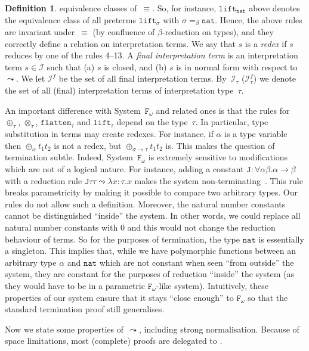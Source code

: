 \documentclass[a4paper,UKenglish,cleveref,autoref,numberwithinsect]{lipics-v2019}
\theoremstyle{definition}
\newtheorem{defn}[theorem]{Definition}
\newcommand{\Fomega}{\mathtt{F}_\omega}
\newcommand{\Iterms}{\mathcal{I}}
\newcommand{\arrtype}{\rightarrow}
\newcommand{\arrW}{\leadsto}
\newcommand{\nat}{\mathtt{nat}}
\newcommand{\flatten}{\mathtt{flatten}}
\newcommand{\lift}{\mathtt{lift}}
\begin{document}
\begin{defn}
  equivalence classes of~$\equiv$. So, for instance,
  $\lift_\nat$ above denotes
  the equivalence class of all preterms $\lift_\sigma$ with
  $\sigma =_\beta \nat$. Hence, the above rules are invariant
  under~$\equiv$ (by confluence of $\beta$-reduction on types), and
  they correctly define a relation on interpretation terms. We say
  that $s$ is a \emph{redex} if $s$ reduces by one of the rules 4--13.
%
  A \emph{final interpretation term} is an interpretation term $s \in
  \Iterms$ such that (a) $s$ is closed, and (b) $s$ is in normal form
  with respect to $\arrW$.  We let $\Iterms^f$ be the set of all final
  interpretation terms. By~$\Iterms_\tau$ ($\Iterms^f_\tau$) we denote
  the set of all (final) interpretation terms of interpretation
  type~$\tau$.
\end{defn}

An important difference with System~$\Fomega$ and related ones is that
the rules for $\oplus_\tau$, $\otimes_\tau$, $\flatten_\tau$ and
$\lift_\tau$ depend on the type~$\tau$. In particular, type
substitution in terms may create redexes. For instance, if $\alpha$ is
a type variable then $\oplus_\alpha t_1 t_2$ is not a redex, but
$\oplus_{\sigma\arrtype\tau} t_1 t_2$ is. This makes the question of
termination subtle. Indeed, System~$\Fomega$ is extremely sensitive to
modifications which are not of a logical nature. For instance, adding
a constant $\mathtt{J} : \forall \alpha \beta . \alpha \arrtype \beta$
with a reduction rule
$\mathtt{J} \tau \tau \leadsto \lambda x : \tau . x$ makes the system
non-terminating~\cite{Girard1971}. This rule breaks parametricity by
making it possible to compare two arbitrary types. Our rules do not allow such a
definition. Moreover, the natural number constants cannot be
  distinguished ``inside'' the system. In other words, we could
  replace all natural number constants with 0 and this would not
  change the reduction behaviour of terms. So for the purposes of
  termination, the type $\nat$ is essentially a singleton. This
  implies that, while we have polymorphic functions between an
  arbitrary type $\alpha$ and $\nat$ which are not constant when seen
  ``from outside'' the system, they are constant for the purposes of
  reduction ``inside'' the system (as they would have to be in a
  parametric $\Fomega$-like system). Intuitively, these properties of
  our system ensure that it stays ``close enough'' to $\Fomega$ so
  that the standard termination proof still generalises.

Now we state some properties of~$\arrW$, including strong
normalisation. Because of space limitations, most (complete)
proofs are delegated to \cite[Appendix~A.1]{versionwithappendix}.
\end{document}

